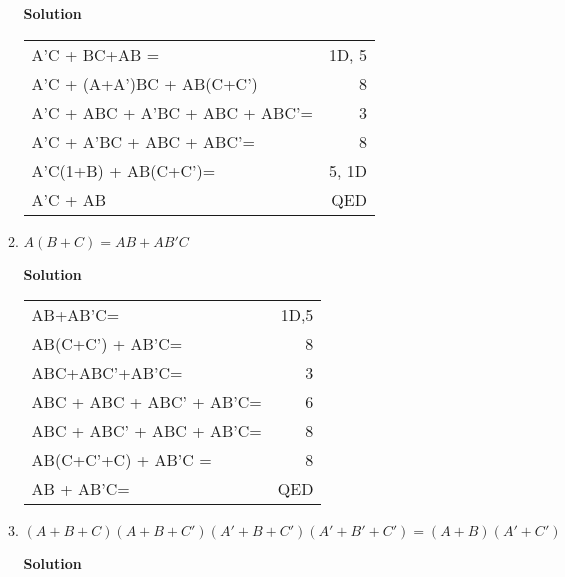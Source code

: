 \begin{enumerate}
\begin{enumerate}
                \begin{onlysolution}  \textbf{Solution} \itshape

                    \begin{tabular}{lr}
                        A'C + BC+AB =                      & 1D, 5 \\
                        A'C + (A+A')BC + AB(C+C')             & 8  \\
                        A'C + ABC + A'BC + ABC + ABC'=             & 3\\
                        A'C + A'BC + ABC + ABC'=             & 8\\
                        A'C(1+B) + AB(C+C')=                 & 5, 1D\\
                        A'C + AB                     & QED \\
                    \end{tabular}
                \end{onlysolution}
            \item $A(B+C)=AB+AB'C$

                \begin{onlysolution}  \textbf{Solution} \itshape

                    \begin{tabular}{lr}
                        AB+AB'C=                     & 1D,5\\
                        AB(C+C') + AB'C=                 & 8 \\
                        ABC+ABC'+AB'C=                     & 3 \\
                        ABC + ABC + ABC' + AB'C=             & 6\\
                        ABC + ABC' + ABC + AB'C=             & 8\\
                        AB(C+C'+C) + AB'C =                 & 8\\
                        AB + AB'C=                     & QED\\
                    \end{tabular}
                \end{onlysolution}
            \item $(A+B+C)(A+B+C')(A'+B+C')(A'+B'+C') = (A+B)(A'+C')$

                \begin{onlysolution}  \textbf{Solution} \itshape


\end{onlysolution}
\end{enumerate}
\end{enumerate}
